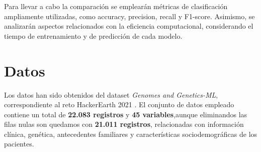 \documentclass[11pt,a4paper,spanish]{book}
\numberwithin{equation}{chapter}
\numberwithin{figure}{chapter}
\begin{document}
Para llevar a cabo la comparación se emplearán métricas de clasificación ampliamente utilizadas, como accuracy, precision, recall y F1-score. Asimismo, se analizarán aspectos relacionados con la eficiencia computacional, considerando el tiempo de entrenamiento y de predicción de cada modelo.

\section{Datos}
Los datos han sido obtenidos del dataset \textit{Genomes and Genetics-ML}, correspondiente al reto HackerEarth 2021 \cite{kagglePredictGenetic}.  
El conjunto de datos empleado contiene un total de \textbf{22.083 registros} y \textbf{45 variables},aunque eliminandos las filas nulas son quedamos con \textbf{21.011 registros}, relacionadas con información clínica, genética, antecedentes familiares y características sociodemográficas de los pacientes.  
\end{document}
